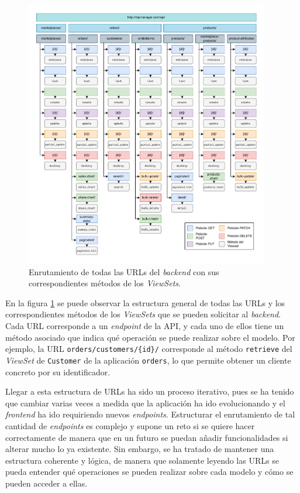 \begin{figure}[H]
    \centering
    \includegraphics[width=0.95\textwidth]{figures/design_develop/estructura_urls.pdf}
    \caption{Enrutamiento de todas las URLs del \textit{backend} con sus correspondientes métodos de los \textit{ViewSets}.}
    \label{dev:fig:estructura_urls}
\end{figure}

En la figura \ref{dev:fig:estructura_urls} se puede observar la estructura general de todas las URLs y los correspondientes métodos de los \textit{ViewSets} que se pueden solicitar al \textit{backend}. Cada URL corresponde a un \textit{endpoint} de la API, y cada uno de ellos tiene un método asociado que indica qué operación se puede realizar sobre el modelo. Por ejemplo, la URL \texttt{orders/customers/\{id\}/} corresponde al método \texttt{retrieve} del \textit{ViewSet} de \texttt{Customer} de la aplicación \texttt{orders}, lo que permite obtener un cliente concreto por su identificador.

Llegar a esta estructura de URLs ha sido un proceso iterativo, pues se ha tenido que cambiar varias veces a medida que la aplicación ha ido evolucionando y el \textit{frontend} ha ido requiriendo nuevos \textit{endpoints}. Estructurar el enrutamiento de tal cantidad de \textit{endpoints} es complejo y supone un reto si se quiere hacer correctamente de manera que en un futuro se puedan añadir funcionalidades si alterar mucho lo ya existente. Sin embargo, se ha tratado de mantener una estructura coherente y lógica, de manera que solamente leyendo las URLs se pueda entender qué operaciones se pueden realizar sobre cada modelo y cómo se pueden acceder a ellas.

